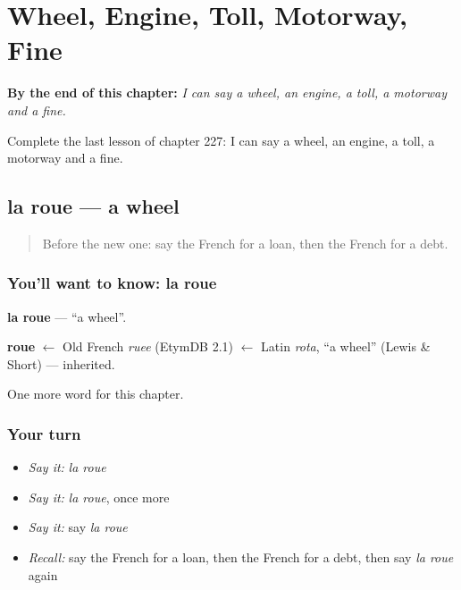 
\chapter{Wheel, Engine, Toll, Motorway, Fine}
\label{ch:fr-wheel-engine-toll-motorway-fine}

\begin{chapteropening}
\textbf{By the end of this chapter:} \emph{I can say a wheel, an engine, a toll, a motorway and a fine.}

Complete the last lesson of chapter 227: I can say a wheel, an engine, a toll, a motorway and a fine.
\end{chapteropening}

\section[la roue]{la roue — a wheel}

\label{lesson:FR-C227-roue}



\begin{quote}
Before the new one: say the French for a loan, then the French for a debt.
\end{quote}

\subsection*{You'll want to know: la roue}
\textbf{la roue} — \textquotedblleft{}a wheel\textquotedblright{}.

\begin{cousinweb}
\textbf{roue} $\leftarrow$ Old French \emph{ruee} (EtymDB 2.1) $\leftarrow$ Latin \emph{rota}, \textquotedblleft{}a wheel\textquotedblright{} (Lewis \& Short) — inherited.
\end{cousinweb}

\begin{grammarlens}[title={What you've built}]
One more word for this chapter.
\end{grammarlens}

\subsection*{Your turn}
\begin{itemize}
\raggedright
  \item \emph{Say it:} \emph{la roue}
  \item \emph{Say it:} \emph{la roue}, once more
  \item \emph{Say it:} say \emph{la roue}
  \item \emph{Recall:} say the French for a loan, then the French for a debt, then say \emph{la roue} again
\end{itemize}

